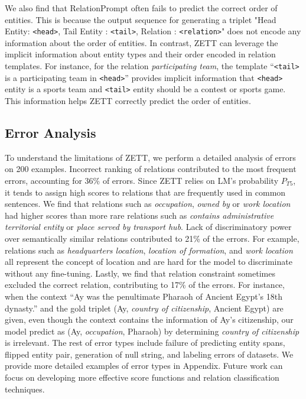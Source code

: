 {We also find that RelationPrompt often fails to predict the correct order of entities. This is because the output sequence for generating a triplet "Head Entity: \texttt{<head>}, Tail Entity : \texttt{<tail>}, Relation : \texttt{<relation>}" does not encode any information about the order of entities. In contrast, ZETT can leverage the implicit information about entity types and their order encoded in relation templates. For instance, for the relation \textit{participating team}, the template ``\texttt{<tail>} is a participating team in \texttt{<head>}'' provides implicit information that \texttt{<head>} entity is a sports team and \texttt{<tail>} entity should be a contest or sports game. This information helps ZETT correctly predict the order of entities.}

\subsection{Error Analysis}
\label{sec:error_analysis}

To understand the limitations of ZETT, we perform a detailed analysis of errors on 200 examples. Incorrect ranking of relations contributed to the most frequent errors, accounting for 36\% of errors. Since ZETT relies on LM's probability $P_{T5}$, it tends to assign high scores to relations that are frequently used in common sentences. We find that relations such as \textit{occupation}, \textit{owned by} or \textit{work location} had higher scores than more rare relations such as \textit{contains administrative territorial entity} or \textit{place served by transport hub}.
Lack of discriminatory power over semantically similar relations contributed to 21\% of the errors. For example, relations such as \textit{headquarters location}, \textit{location of formation}, and \textit{work location}\, all represent the concept of location and are hard for the model to discriminate without any fine-tuning.
Lastly, we find that relation constraint sometimes excluded the correct relation, contributing to 17\% of the errors. For instance, when the context ``Ay was the penultimate Pharaoh of Ancient Egypt's 18th dynasty.'' and the gold triplet (Ay, \textit{country of citizenship}, Ancient Egypt) are given, even though the context contains the information of Ay's citizenship, our model predict as (Ay,	\textit{occupation}, Pharaoh) by determining \textit{country of citizenship} is irrelevant.
The rest of error types include failure of predicting entity spans, flipped entity pair, generation of null string, and labeling errors of datasets. We provide more detailed examples of error types in Appendix. Future work can focus on developing more effective score functions and relation classification techniques.

